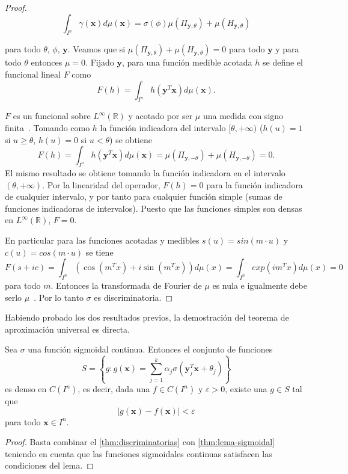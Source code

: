 \begin{proof}
$$\int_{I^n} \gamma(\textbf{x})d\mu(\textbf{x}) = \sigma(\phi)\mu(\Pi_{\textbf{y}, \theta}) + \mu(H_{\textbf{y}, \theta})$$

para todo $\theta$, $\phi$, $\textbf{y}$. Veamos que si $\mu(\Pi_{\textbf{y}, \theta}) + \mu(H_{\textbf{y}, \theta}) = 0$ para todo $\textbf{y}$ y para todo $\theta$ entonces $\mu = 0$. Fijado $\textbf{y}$, para una función medible acotada $h$ se define el funcional lineal $F$ como $$F(h) = \int_{I^n}h(\textbf{y}^T\textbf{x})d\mu(\textbf{x}).$$

$F$ es un funcional sobre $L^{\infty}(\mathbb{R})$ y acotado por ser $\mu$ una medida con signo finita~\cite{halmos1976measure}. Tomando como $h$ la función indicadora del intervalo $[\theta, +\infty)$ ($h(u) = 1$ si $u \geq \theta$, $h(u) = 0$ si $u < \theta$) se obtiene $$F(h) = \int_{I^n}h(\textbf{y}^T\textbf{x})d\mu(\textbf{x}) = \mu(\Pi_{\textbf{y}, -\theta}) + \mu(H_{\textbf{y}, -\theta}) = 0.$$ El mismo resultado se obtiene tomando la función indicadora en el intervalo $(\theta, + \infty)$. Por la linearidad del operador, $F(h) = 0$ para la función indicadora de cualquier intervalo, y por tanto para cualquier función simple (sumas de funciones indicadoras de intervalos). Puesto que las funciones simples son densas en $L^{\infty}(\mathbb{R})$, $F = 0$.

En particular para las funciones acotadas y medibles $s(u) = sin (m \cdot u)$ y $c(u) = cos(m \cdot u)$ se tiene $$F(s + ic) = \int_{I^n}(\cos(m^Tx) + i \sin(m^Tx))d\mu(x) = \int_{I^n}exp(im^Tx)d\mu(x) = 0  $$
para todo $m$. Entonces la transformada de Fourier de $\mu$ es nula e igualmente debe serlo $\mu$~\cite{duoandikoetxea2003lecciones}. Por lo tanto $\sigma$ es discriminatoria.
\end{proof}

Habiendo probado los dos resultados previos, la demostración del teorema de aproximación universal es directa.

\begin{teorema} Sea $\sigma$ una función sigmoidal continua. Entonces el conjunto de funciones $$S = \left\{ g: g(\textbf{x}) = \sum_{j=1}^k \alpha_j \sigma(\textbf{y}_j^T \textbf{x} + \theta_j) \right\}$$
es denso en $C(I^n)$, es decir, dada una $f \in C(I^n)$ y $\varepsilon > 0$, existe una $g \in S$ tal que
$$\left|g(\textbf{x}) - f(\textbf{x})\right| < \varepsilon$$ para todo $\textbf{x} \in I^n$.
\begin{proof} Basta combinar el \autoref{thm:discriminatorias} con \autoref{thm:lema-sigmoidal} teniendo en cuenta que las funciones sigmoidales continuas satisfacen las condiciones del lema.
\end{proof}

\end{teorema}

